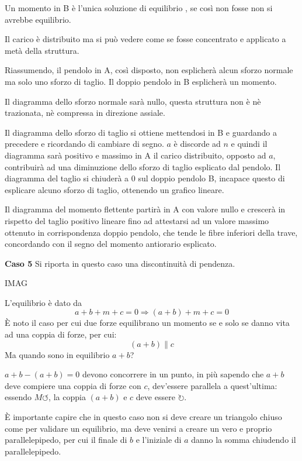 \documentclass{article}
\begin{document}
\begin{adjustwidth}{2in}{}
	Un momento in B è l'unica soluzione di equilibrio , se così non fosse non si avrebbe equilibrio. \newline

	Il carico è distribuito ma si può vedere come se fosse concentrato e applicato a metà della struttura. \newline
	 
	Riassumendo, il pendolo in A, così disposto, non esplicherà alcun sforzo normale ma solo uno sforzo di taglio. Il doppio pendolo in B esplicherà un momento. \newline
	
	Il diagramma dello sforzo normale sarà nullo, questa struttura non è nè trazionata, nè compressa in direzione assiale. \newline
	
	Il diagramma dello sforzo di taglio si ottiene mettendosi in B e guardando a precedere e ricordando di cambiare di segno. $a$ è discorde ad $n$ e quindi il diagramma sarà positivo e massimo in A il carico distribuito, opposto ad $a$, contribuirà ad una diminuzione dello sforzo di taglio esplicato dal pendolo. Il diagramma del taglio si chiuderà a 0 sul doppio pendolo B, incapace questo di esplicare alcuno sforzo di taglio, ottenendo un grafico lineare. \newline
	
	Il diagramma del momento flettente partirà in A con valore nullo e crescerà in rispetto del taglio positivo lineare fino ad attestarsi ad un valore massimo ottenuto in corrispondenza doppio pendolo, che tende le fibre inferiori della trave, concordando con il segno del momento antiorario esplicato.  \newline
	
	\textbf{Caso 5}\newline
	Si riporta in questo caso una discontinuità di pendenza. 
	
	IMAG
	
	L'equilibrio è dato da
	\[a+b+m+c=0 \Rightarrow(a+b)+m+c=0\]
	È noto il caso per cui due forze equilibrano un momento se e solo se danno vita ad una coppia di forze, per cui:
	\[(a+b)\parallel c\] 
	Ma quando sono in equilibrio $a+b$?
	
	$a+b-(a+b) = 0$ devono concorrere in un punto, in più sapendo che $a+b$ deve compiere una coppia di forze con $c$, dev'essere parallela a quest'ultima: essendo $M\circlearrowleft$, la coppia $(a+b)$ e $c$ deve essere $ \circlearrowright $. 
	
	È importante capire che in questo caso non si deve creare un triangolo chiuso come per validare un equilibrio, ma deve venirsi a creare un vero e proprio parallelepipedo, per cui il finale di $b$ e l'iniziale di $a$ danno la somma chiudendo il parallelepipedo. 
	

\end{adjustwidth}
\end{document}
